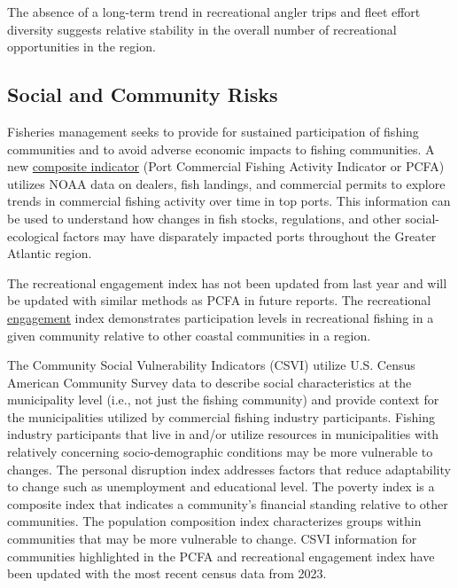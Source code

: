 \documentclass[
  10pt,
]{article}
\begin{document}
The absence of a long-term trend in recreational angler trips and fleet effort diversity suggests relative stability in the overall number of recreational opportunities in the region.

\subsection{Social and Community Risks}\label{social-and-community-risks}

Fisheries management seeks to provide for sustained participation of fishing communities and to avoid adverse economic impacts to fishing communities. A new \href{https://noaa-edab.github.io/catalog/engagement.html?q=engage\#introduction-to-indicator-72}{composite indicator} (Port Commercial Fishing Activity Indicator or PCFA) utilizes NOAA data on dealers, fish landings, and commercial permits to explore trends in commercial fishing activity over time in top ports. This information can be used to understand how changes in fish stocks, regulations, and other social-ecological factors may have disparately impacted ports throughout the Greater Atlantic region.

The recreational engagement index has not been updated from last year and will be updated with similar methods as PCFA in future reports. The recreational \href{https://noaa-edab.github.io/catalog/engagement.html}{engagement} index demonstrates participation levels in recreational fishing in a given community relative to other coastal communities in a region.

The Community Social Vulnerability Indicators (CSVI) utilize U.S. Census American Community Survey data to describe social characteristics at the municipality level (i.e., not just the fishing community) and provide context for the municipalities utilized by commercial fishing industry participants. Fishing industry participants that live in and/or utilize resources in municipalities with relatively concerning socio-demographic conditions may be more vulnerable to changes. The personal disruption index addresses factors that reduce adaptability to change such as unemployment and educational level. The poverty index is a composite index that indicates a community's financial standing relative to other communities. The population composition index characterizes groups within communities that may be more vulnerable to change. CSVI information for communities highlighted in the PCFA and recreational engagement index have been updated with the most recent census data from 2023.
\end{document}
